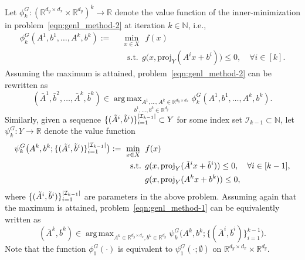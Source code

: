 \documentclass{article}
\DeclareMathOperator*{\argmax}{arg\,max}
\newcommand{\uset}[2]{\ensuremath{\underset{#1}{#2}}}
\DeclarePairedDelimiter\abs{\lvert}{\rvert}%
\newcommand{\N}{\mathbb{N}}
\newcommand{\R}{\mathbb{R}}
\newcommand{\1}[1]{\mathds{1}\left[#1\right]}
\begin{document}
Let $\phi^G_k: (\R^{d_y \times d_x} \times \R^{d_y})^k \to \mathbb{R}$ denote the value function of the inner-minimization in problem~\eqref{eqn:genl_method-2} at iteration $k \in \N$, i.e., 
\begin{align}
\label{eqn:genl_method-2_valuefn}
\phi^G_k(A^1,b^1,\dots,A^k,b^k) := \:\: & \min_{x \in X} \:\: f(x) \\
& \:\:\:\text{s.t.} \:\: g\bigl(x,\text{proj}_Y(A^i x + b^i)\bigr) \leq 0, \quad \forall i \in [k]. \nonumber
\end{align}
Assuming the maximum is attained, problem~\eqref{eqn:genl_method-2} can be rewritten as
\begin{equation*} 
(\bar{A}^1,\bar{b}^2,\dots,\bar{A}^k,\bar{b}^k) \in \uset{b^1,\dots,b^k \in \R^{d_y}}{\argmax_{A^1,\dots,A^k \in \R^{d_y \times d_x}}} \phi^G_k(A^1,b^1,\dots,A^k,b^k).
\end{equation*}
Similarly, given a sequence $\{(\tilde{A}^i, \tilde{b}^i)\}_{i=1}^{\abs{\mathcal{I}_{k-1}}} \subset Y$ for some index set $\mathcal{I}_{k-1} \subset \N$, let $\psi^G_k: Y \to \mathbb{R}$ denote the value function 
\begin{align}
\label{eqn:genl_method-1_valuefn}
\psi^G_k\bigl(A^k,b^k;\{(\tilde{A}^i, \tilde{b}^i)\}_{i=1}^{\abs{\mathcal{I}_{k-1}}}\bigr) := \:\: & \min_{x \in X} \:\: f(x) \\*
& \:\:\:\text{s.t.} \:\: g(x,\text{proj}_Y(\tilde{A}^i x + \tilde{b}^i)) \leq 0, \quad \forall i \in [k-1], \nonumber \\*
& \quad\quad\:\: g(x,\text{proj}_Y(A^k x + b^k)) \leq 0, \nonumber
\end{align}
where $\{(\tilde{A}^i,\tilde{b}^i)\}_{i=1}^{\abs{\mathcal{I}_{k-1}}}$ are parameters in the above problem.
Assuming again that the maximum is attained, problem~\eqref{eqn:genl_method-1} can be equivalently written as
\begin{equation*} 
(\bar{A}^k, \bar{b}^k) \in \argmax_{A^k \in \R^{d_y \times d_x}, b^k \in \R^{d_y}} \psi^G_k\bigl(A^k, b^k;\{(\bar{A}^i,\bar{b}^i)\}_{i=1}^{k-1}\bigr).
\end{equation*}
Note that the function $\phi^G_1(\cdot)$ is equivalent to $\psi^G_1(\cdot;\emptyset)$ on $\R^{d_y \times d_x} \times \R^{d_y}$.
\end{document}
